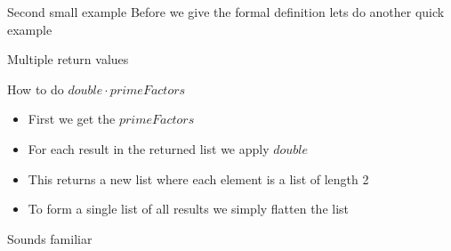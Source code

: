 \begin{frame}[fragile]{}
    \begin{block}{Second small example}
        Before we give the formal definition lets do another quick example
    \end{block}
\end{frame}

\begin{frame}[fragile]{Multiple return values}
    \begin{block}{}
        
    \end{block}
\end{frame}

\begin{frame}[fragile]{}
    \begin{block}{How to do $double \cdot primeFactors$}
        \begin{itemize}
            \item First we get the $primeFactors$
            \item For each result in the returned list we apply $double$
            \item This returns a new list where each element is a list of length 2
            \item To form a single list of all results we simply flatten the list
        \end{itemize}
    \end{block}
\end{frame}

\begin{frame}[fragile]{}
    \begin{block}{Sounds familiar}
        
    \end{block}
\end{frame}
